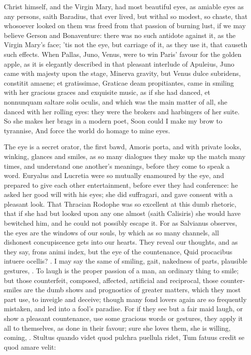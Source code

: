 {Christ himself, and the Virgin Mary, had most beautiful eyes, as
amiable eyes as any persons, saith Baradius, that ever lived, but
withal so modest, so chaste, that whosoever looked on them was freed
from that passion of burning lust, if we may believe Gerson and
Bonaventure: there was no such antidote against it, as the Virgin
Mary's face; 'tis not the eye, but carriage of it, as they use it, that
causeth such effects. When Pallas, Juno, Venus, were to win Paris'
favour for the golden apple, as it is elegantly described in that
pleasant interlude of Apuleius, Juno came with majesty upon the
stage, Minerva gravity, but Venus dulce subridens, constitit amaene; et
gratissimae, Graticae deam propitiantes, \etc{} came in smiling with her
gracious graces and exquisite music, as if she had danced, et
nonnunquam saltare solis oculis, and which was the main matter of all,
she danced with her rolling eyes: they were the brokers and harbingers
of her suite. So she makes her brags in a modern poet,
Soon could I make my brow to tyrannise,
And force the world do homage to mine eyes.

The eye is a secret orator, the first bawd, Amoris porta, and with
private looks, winking, glances and smiles, as so many dialogues they
make up the match many times, and understand one another's meanings,
before they come to speak a word. Euryalus and Lucretia were so
mutually enamoured by the eye, and prepared to give each other
entertainment, before ever they had conference: he asked her good will
with his eyes; she did suffragari, and gave consent with a pleasant
look. That Thracian Rodophe was so excellent at this dumb
rhetoric, that if she had but looked upon any one almost (saith
Calisiris) she would have bewitched him, and he could not possibly
escape it. For as Salvianus observes, the eyes are the windows of
our souls, by which as so many channels, all dishonest concupiscence
gets into our hearts. They reveal our thoughts, and as they say, frons
animi index, but the eye of the countenance, Quid procacibus
intuere ocellis? \etc{}. I may say the same of smiling, gait, nakedness of
parts, plausible gestures, \etc{}. To laugh is the proper passion of a man,
an ordinary thing to smile; but those counterfeit, composed, affected,
artificial and reciprocal, those counter-smiles are the dumb shows and
prognostics of greater matters, which they most part use, to inveigle
and deceive; though many fond lovers again are so frequently mistaken,
and led into a fool's paradise. For if they see but a fair maid laugh,
or show a pleasant countenance, use some gracious words or gestures,
they apply it all to themselves, as done in their favour; sure she
loves them, she is willing, coming, \etc{}.
Stultus quando videt quod pulchra puellula ridet,
Tum fatuus credit se quod amare velit:

}

